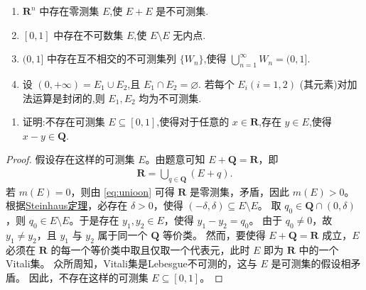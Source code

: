 \documentclass[../../main.tex]{subfiles}%
\begin{document}
\begin{proposition}
\begin{enumerate}[(1)]
\item \(\bm{R}^n\) 中存在零测集 \(E\),使 \(E+E\) 是不可测集.
\item \([0,1]\) 中存在不可数集 \(E\),使 \(E \setminus E\) 无内点.
\item \((0,1]\) 中存在互不相交的不可测集列 \(\{W_n\}\),使得 \(\bigcup\limits_{n=1}^\infty W_n = (0,1]\).
\item 设 \((0, +\infty) = E_1 \cup E_2\),且 \(E_1 \cap E_2 = \varnothing\). 若每个 \(E_i (i=1,2)\) (其元素)对加法运算是封闭的,则 \(E_1, E_2\) 均为不可测集.
\end{enumerate}
\end{proposition}

\begin{example}
\begin{enumerate}[(1)]
\item 证明:不存在可测集 \(E \subseteq [0,1]\),使得对于任意的 \(x\in \bm{R}\),存在 \(y\in E\),使得 \(x-y\in \bm{Q}\).
\end{enumerate}
\end{example}
\begin{proof}
假设存在这样的可测集 \(E\)。由题意可知 \(E + \bm{Q} = \bm{R}\)，即
\begin{align}
\bm{R} = \bigcup\limits_{q \in \bm{Q}} (E+q). \label{eq:unioon}
\end{align}
若 \(m(E)=0\)，则由 \eqref{eq:unioon} 可得 \(\bm{R}\) 是零测集，矛盾，因此 \(m(E) > 0\)。
根据\hyperref[theorem:Steinhaus定理]{Steinhaus定理}，必存在 \(\delta > 0\)，使得 \((-\delta, \delta) \subseteq E \setminus E\)。
取 \(q_0 \in \bm{Q} \cap (0, \delta)\)，则 \(q_0 \in E \setminus E\)。于是存在 \(y_1, y_2 \in E\)，使得 \(y_1 - y_2 = q_0\)。
由于 \(q_0 \neq 0\)，故 \(y_1 \neq y_2\)，且 \(y_1\) 与 \(y_2\) 属于同一个 \(\bm{Q}\) 等价类。
然而，要使得 \(E + \bm{Q} = \bm{R}\) 成立，\(E\) 必须在 \(\bm{R}\) 的每一个等价类中取且仅取一个代表元，此时 \(E\) 即为 \(\bm{R}\) 中的一个 Vitali集。
众所周知，Vitali集是Lebesgue不可测的，这与 \(E\) 是可测集的假设相矛盾。
因此，不存在这样的可测集 \(E \subseteq [0,1]\)。
\end{proof}
\end{document}
